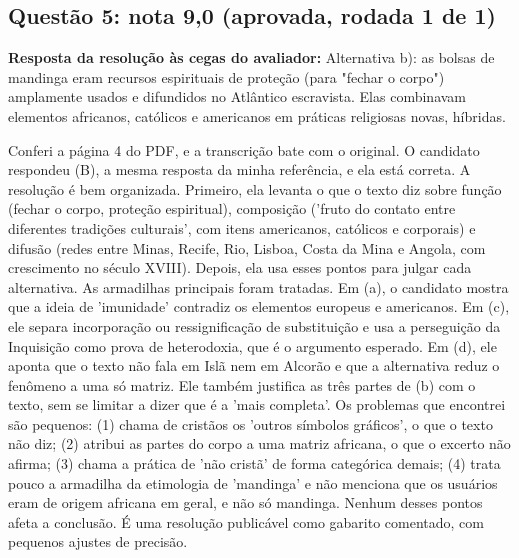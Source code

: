 \documentclass{article}%
\begin{document}
\subsection*{Questão 5: nota 9,0 (aprovada, rodada 1 de 1)}%
\textbf{Resposta da resolução às cegas do avaliador:} Alternativa b): as bolsas de mandinga eram recursos espirituais de proteção (para "fechar o corpo") amplamente usados e difundidos no Atlântico escravista. Elas combinavam elementos africanos, católicos e americanos em práticas religiosas novas, híbridas.\par %
Conferi a página 4 do PDF, e a transcrição bate com o original. O candidato respondeu (B), a mesma resposta da minha referência, e ela está correta. A resolução é bem organizada. Primeiro, ela levanta o que o texto diz sobre função (fechar o corpo, proteção espiritual), composição ('fruto do contato entre diferentes tradições culturais', com itens americanos, católicos e corporais) e difusão (redes entre Minas, Recife, Rio, Lisboa, Costa da Mina e Angola, com crescimento no século XVIII). Depois, ela usa esses pontos para julgar cada alternativa. As armadilhas principais foram tratadas. Em (a), o candidato mostra que a ideia de 'imunidade' contradiz os elementos europeus e americanos. Em (c), ele separa incorporação ou ressignificação de substituição e usa a perseguição da Inquisição como prova de heterodoxia, que é o argumento esperado. Em (d), ele aponta que o texto não fala em Islã nem em Alcorão e que a alternativa reduz o fenômeno a uma só matriz. Ele também justifica as três partes de (b) com o texto, sem se limitar a dizer que é a 'mais completa'. Os problemas que encontrei são pequenos: (1) chama de cristãos os 'outros símbolos gráficos', o que o texto não diz; (2) atribui as partes do corpo a uma matriz africana, o que o excerto não afirma; (3) chama a prática de 'não cristã' de forma categórica demais; (4) trata pouco a armadilha da etimologia de 'mandinga' e não menciona que os usuários eram de origem africana em geral, e não só mandinga. Nenhum desses pontos afeta a conclusão. É uma resolução publicável como gabarito comentado, com pequenos ajustes de precisão.%
\end{document}
